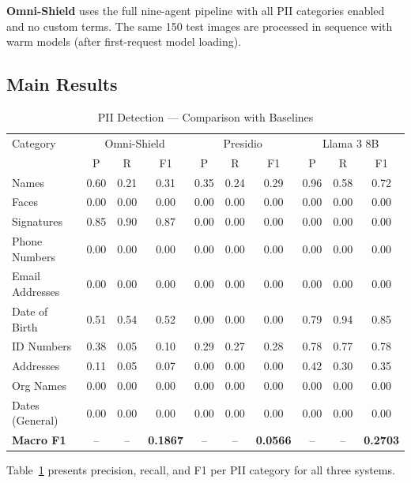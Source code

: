 \documentclass[conference]{IEEEtran}
\begin{document}
\textbf{Omni-Shield} uses the full nine-agent
pipeline with all PII categories enabled and no
custom terms.
The same 150 test images are processed in sequence
with warm models (after first-request model loading).

\subsection{Main Results}

\begin{table}[h]\centering
\caption{PII Detection --- Comparison with Baselines}
\label{tab:comparison}
\begin{tabular}{lccccccccc}
\toprule
Category & \multicolumn{3}{c}{Omni-Shield} & \multicolumn{3}{c}{Presidio} & \multicolumn{3}{c}{Llama 3 8B} \\
 & P & R & F1 & P & R & F1 & P & R & F1 \\
\midrule
Names & 0.60 & 0.21 & 0.31 & 0.35 & 0.24 & 0.29 & 0.96 & 0.58 & 0.72 \\
Faces & 0.00 & 0.00 & 0.00 & 0.00 & 0.00 & 0.00 & 0.00 & 0.00 & 0.00 \\
Signatures & 0.85 & 0.90 & 0.87 & 0.00 & 0.00 & 0.00 & 0.00 & 0.00 & 0.00 \\
Phone Numbers & 0.00 & 0.00 & 0.00 & 0.00 & 0.00 & 0.00 & 0.00 & 0.00 & 0.00 \\
Email Addresses & 0.00 & 0.00 & 0.00 & 0.00 & 0.00 & 0.00 & 0.00 & 0.00 & 0.00 \\
Date of Birth & 0.51 & 0.54 & 0.52 & 0.00 & 0.00 & 0.00 & 0.79 & 0.94 & 0.85 \\
ID Numbers & 0.38 & 0.05 & 0.10 & 0.29 & 0.27 & 0.28 & 0.78 & 0.77 & 0.78 \\
Addresses & 0.11 & 0.05 & 0.07 & 0.00 & 0.00 & 0.00 & 0.42 & 0.30 & 0.35 \\
Org Names & 0.00 & 0.00 & 0.00 & 0.00 & 0.00 & 0.00 & 0.00 & 0.00 & 0.00 \\
Dates (General) & 0.00 & 0.00 & 0.00 & 0.00 & 0.00 & 0.00 & 0.00 & 0.00 & 0.00 \\
\midrule
\textbf{Macro F1} & -- & -- & \textbf{0.1867} & -- & -- & \textbf{0.0566} & -- & -- & \textbf{0.2703} \\
\bottomrule
\end{tabular}
\end{table}

Table~\ref{tab:comparison} presents precision,
recall, and F1 per PII category for all three
systems.
\end{document}
